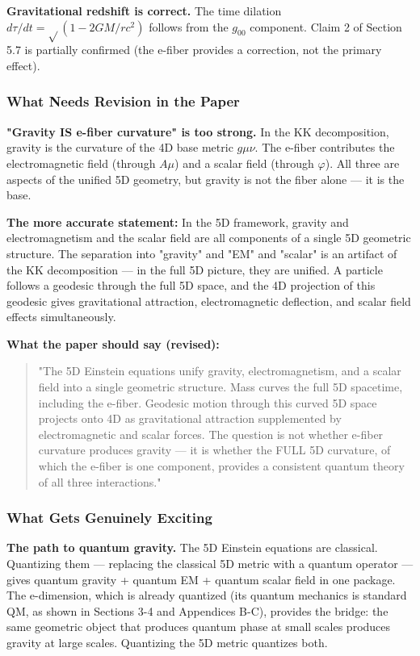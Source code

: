 \documentclass[aps,prd,preprint,superscriptaddress,longbibliography,floatfix]{revtex4-2}
\theoremstyle{remark}
\begin{document}
\textbf{Gravitational redshift is correct.} The time dilation $d\tau/dt = \sqrt{}(1 - 2GM/rc^{2})$ follows from the $g_{00}$ component. Claim 2 of Section 5.7 is partially confirmed (the e-fiber provides a correction, not the primary effect).


\subsubsection{What Needs Revision in the Paper}

\textbf{"Gravity IS e-fiber curvature" is too strong.} In the KK decomposition, gravity is the curvature of the 4D base metric $g\mu\nu$. The e-fiber contributes the electromagnetic field (through $A\mu$) and a scalar field (through $\varphi$). All three are aspects of the unified 5D geometry, but gravity is not the fiber alone --- it is the base.

\textbf{The more accurate statement:} In the 5D framework, gravity and electromagnetism and the scalar field are all components of a single 5D geometric structure. The separation into "gravity" and "EM" and "scalar" is an artifact of the KK decomposition --- in the full 5D picture, they are unified. A particle follows a geodesic through the full 5D space, and the 4D projection of this geodesic gives gravitational attraction, electromagnetic deflection, and scalar field effects simultaneously.

\textbf{What the paper should say (revised):}


\begin{quote}
"The 5D Einstein equations unify gravity, electromagnetism, and a scalar
field into a single geometric structure. Mass curves the full 5D spacetime,
including the e-fiber. Geodesic motion through this curved 5D space projects
onto 4D as gravitational attraction supplemented by electromagnetic and
scalar forces. The question is not whether e-fiber curvature produces
gravity --- it is whether the FULL 5D curvature, of which the e-fiber is one
component, provides a consistent quantum theory of all three interactions."
\end{quote}


\subsubsection{What Gets Genuinely Exciting}

\textbf{The path to quantum gravity.} The 5D Einstein equations are classical. Quantizing them --- replacing the classical 5D metric with a quantum operator --- gives quantum gravity + quantum EM + quantum scalar field in one package. The e-dimension, which is already quantized (its quantum mechanics is standard QM, as shown in Sections 3-4 and Appendices B-C), provides the bridge: the same geometric object that produces quantum phase at small scales produces gravity at large scales. Quantizing the 5D metric quantizes both.
\end{document}
